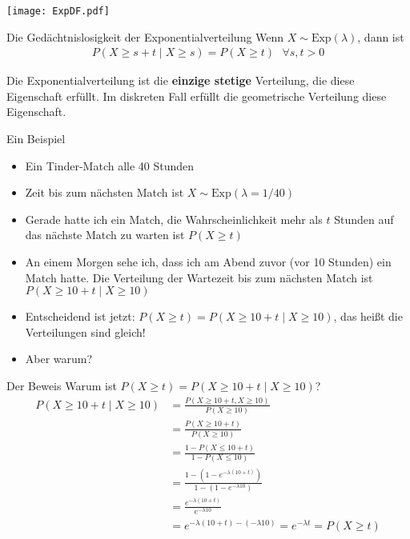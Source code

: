 \documentclass[t,11pt,aspectratio=169]{beamer}
\begin{document}
\begin{frame}
	\begin{center}
		\texttt{[image: ExpDF.pdf]}
	\end{center}
\end{frame}

\begin{frame}{Die Gedächtnislosigkeit der Exponentialverteilung}
	Wenn $X\sim \text{Exp}(\lambda)$, dann ist
	\begin{align*}
		P(X\geq s+t\mid X\geq s) = P(X\geq t)~~~\forall s,t > 0
	\end{align*}

	\pause Die Exponentialverteilung ist die \textbf{einzige stetige} Verteilung, die diese Eigenschaft erfüllt. Im diskreten Fall erfüllt die geometrische Verteilung diese Eigenschaft.
\end{frame}

\begin{frame}{Ein Beispiel}
	\begin{itemize}
		\item Ein Tinder-Match alle 40 Stunden
		\item Zeit bis zum nächsten Match ist $X\sim\text{Exp}(\lambda=1/40)$
		\item Gerade hatte ich ein Match, die Wahrscheinlichkeit mehr als $t$ Stunden auf das nächste Match zu warten ist $P(X\geq t)$
		\item An einem Morgen sehe ich, dass ich am Abend zuvor (vor 10 Stunden) ein Match hatte. Die Verteilung der Wartezeit bis zum nächsten Match ist $P(X\geq 10+t \mid X\geq 10)$
		\item Entscheidend ist jetzt: $P(X\geq t)=P(X\geq 10+t \mid X\geq 10)$, das heißt die Verteilungen sind gleich!
		\item Aber warum?
	\end{itemize}
\end{frame}

\begin{frame}{Der Beweis}
	Warum ist $P(X\geq t)=P(X\geq 10+t \mid X\geq 10)$?
	\pause \begin{align*}
		P(X\geq 10+t \mid X\geq 10) &= \frac{P(X\geq 10+t, X\geq 10)}{P(X\geq 10)} \\
		&= \frac{P(X\geq 10+t)}{P(X\geq 10)} \\
		&= \frac{1-P(X\leq 10+t)}{1-P(X\leq 10)} \\
		&= \frac{1-(1-e^{-\lambda(10+t)})}{1-(1-e^{-\lambda 10})} \\
		&= \frac{e^{-\lambda(10+t)}}{e^{-\lambda 10}} \\
		&= e^{-\lambda(10+t)-(-\lambda10)} = e^{-\lambda t} = P(X\geq t)
	\end{align*}
\end{frame}
\end{document}
